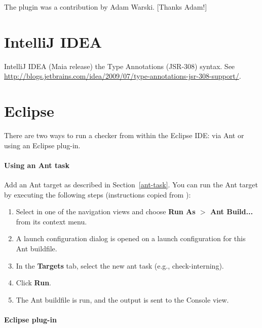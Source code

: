 The plugin was a contribution by Adam Warski.  [Thanks Adam!]

\section{IntelliJ IDEA\label{intellij}}

IntelliJ IDEA (Maia release)
the Type Annotations (JSR-308) syntax.
See \url{http://blogs.jetbrains.com/idea/2009/07/type-annotations-jsr-308-support/}.

\section{Eclipse\label{eclipse}}

There are two ways to run a checker from within the Eclipse IDE:  via Ant
or using an Eclipse plug-in.


\paragraph{Using an Ant task}

Add an Ant target as described in Section~\ref{ant-task}.  You can
run the Ant target by executing the following steps
(instructions copied from
):

\begin{enumerate}

\item
  Select  in one of the navigation views and choose
  {\bf Run As $>$ Ant Build...} from its context menu.

\item
  A launch configuration dialog is opened on a launch configuration
  for this Ant buildfile.

\item
  In the {\bf Targets} tab, select the new ant task (e.g., check-interning).

\item
  Click {\bf Run}.

\item
  The Ant buildfile is run, and the output is sent to the Console view.

\end{enumerate}

\paragraph{Eclipse plug-in}


